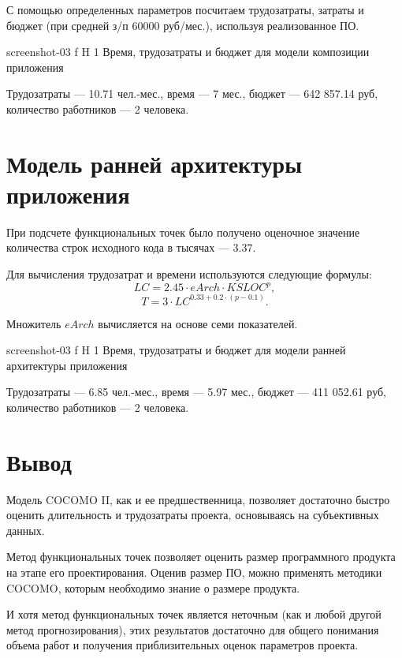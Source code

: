 \documentclass{bmstu}
\begin{document}
С помощью определенных параметров посчитаем трудозатраты, затраты и бюджет (при средней з/п 60000 руб/мес.), используя реализованное ПО.

    {screenshot-03}
    {f}
    {H}
    {1\textwidth}
    {Время, трудозатраты и бюджет для модели композиции приложения}
    
Трудозатраты --- 10.71 чел.-мес., время --- 7 мес., бюджет --- 642 857.14 руб, количество работников --- 2 человека.

\section{Модель ранней архитектуры приложения}

При подсчете функциональных точек было получено оценочное значение количества строк исходного кода в тысячах --- $3.37$.

Для вычисления трудозатрат и времени используются следующие формулы:
\begin{equation}
LC = 2.45 \cdot eArch \cdot KSLOC^{p},
\end{equation}
\begin{equation}
T = 3 \cdot LC^{0.33 + 0.2 \cdot (p - 0.1)}.
\end{equation}

Множитель $eArch$ вычисляется на основе семи показателей.

    {screenshot-03}
    {f}
    {H}
    {1\textwidth}
    {Время, трудозатраты и бюджет для модели ранней архитектуры приложения}
    
Трудозатраты --- 6.85 чел.-мес., время --- 5.97 мес., бюджет --- 411 052.61 руб, количество работников --- 2 человека.
    
\section{Вывод}

Модель COCOMO II, как и ее предшественница, позволяет достаточно быстро оценить длительность и трудозатраты проекта, основываясь на субъективных данных.

Метод функциональных точек позволяет оценить размер программного продукта на этапе его проектирования. 
Оценив размер ПО, можно применять методики COCOMO, которым необходимо знание о размере продукта.

И хотя метод функциональных точек является неточным (как и любой другой метод прогнозирования), этих результатов достаточно для общего понимания объема работ и получения приблизительных оценок параметров проекта.
\end{document}
